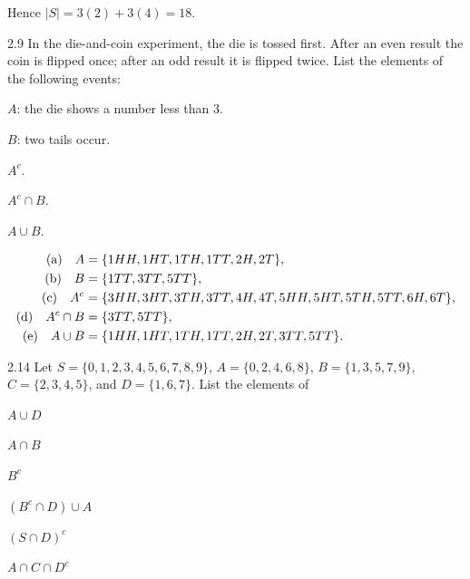 \documentclass[11pt,oneside]{article}
\begin{document}
\begin{solution}
\begin{center}
\end{center}
Hence $|S|=3(2)+3(4)=\boxed{18}$.
\end{solution}

\begin{exercise}{2.9}
In the die-and-coin experiment, the die is tossed first. After an even result the coin is flipped once; after an odd result it is flipped twice. List the elements of the following events:
\begin{exercisesubparts}
\item $A$: the die shows a number less than 3.
\item $B$: two tails occur.
\item $A^c$.
\item $A^c\cap B$.
\item $A\cup B$.
\end{exercisesubparts}
\end{exercise}

\begin{solution}
\begin{align*}
\textup{(a)}\quad A&=\{1HH,1HT,1TH,1TT,2H,2T\},\\
\textup{(b)}\quad B&=\{1TT,3TT,5TT\},\\
\textup{(c)}\quad A^c&=\{3HH,3HT,3TH,3TT,4H,4T,5HH,5HT,5TH,5TT,6H,6T\},\\
\textup{(d)}\quad A^c\cap B&=\{3TT,5TT\},\\
\textup{(e)}\quad A\cup B&=\{1HH,1HT,1TH,1TT,2H,2T,3TT,5TT\}.
\end{align*}
\end{solution}

\begin{exercise}{2.14}
Let $S=\{0,1,2,3,4,5,6,7,8,9\}$, $A=\{0,2,4,6,8\}$, $B=\{1,3,5,7,9\}$, $C=\{2,3,4,5\}$, and $D=\{1,6,7\}$. List the elements of
\par
\begin{exercisesubparts}
\item $A\cup D$
\item $A\cap B$
\item $B^c$
\item $(B^c\cap D)\cup A$
\item $(S\cap D)^c$
\item $A\cap C\cap D^c$
\end{exercisesubparts}
\end{exercise}
\end{document}
